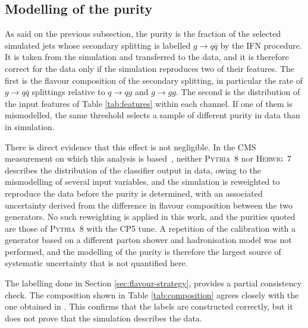 \subsection{Modelling of the purity}
\label{sec:sys-purity}

As said on the previous subsection, the purity is the fraction of the selected simulated jets whose secondary
splitting is labelled $g \to q\bar{q}$ by the IFN procedure. It
is taken from the simulation and transferred to the data, and it is therefore
correct for the data only if the simulation reproduces two of
their features. The first is the flavour composition of the secondary splitting, in particular
the rate of $g \to q\bar{q}$ splittings relative to $q \to qg$ and
$g \to gg$. The second is the distribution of the input features of
Table \ref{tab:features} within each channel. If one of them is mismodelled,
the same threshold selects a sample of different purity in data than in simulation.

There is direct evidence that this effect is not negligible. In the CMS
measurement on which this analysis is based~\cite{CMS:2026jnt}, neither
\textsc{Pythia}~8 nor \textsc{Herwig}~7 describes the distribution of the
classifier output in data, owing to the mismodelling of several input variables,
and the simulation is reweighted to reproduce the data before the purity is
determined, with an associated uncertainty derived from the difference in flavour
composition between the two generators. No such reweighting is applied in this
work, and the purities quoted are those of \textsc{Pythia}~8 with the CP5 tune. A
repetition of the calibration with a generator based on a different parton shower
and hadronisation model was not performed, and the modelling of the purity is
therefore the largest source of systematic uncertainty that is not quantified
here.

The labelling done in Section \ref{sec:flavour-strategy}, provides a partial consistency 
check. The composition shown in Table \ref{tab:composition} agrees closely with the 
one obtained in \cite{CMS:2026jnt}. This confirms that the labels are constructed correctly, but
it does not prove that the simulation describes the data.

